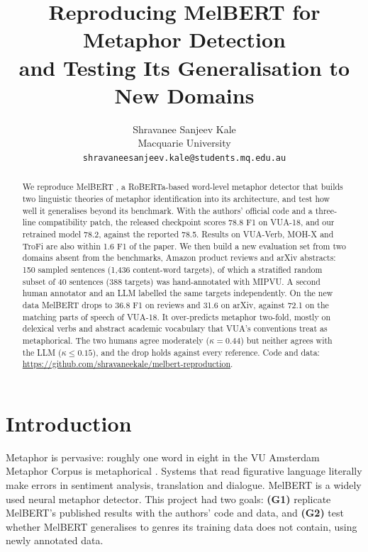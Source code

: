 \documentclass[11pt]{article}
\title{Reproducing MelBERT for Metaphor Detection\\and Testing Its Generalisation to New Domains}
\author{Shravanee Sanjeev Kale \\
  Macquarie University \\
  \texttt{shravaneesanjeev.kale@students.mq.edu.au}}
\newcommand{\repourl}{https://github.com/shravaneekale/melbert-reproduction}
\begin{document}
\maketitle

\begin{abstract}
We reproduce MelBERT \citep{choi-etal-2021-melbert}, a RoBERTa-based word-level metaphor detector that builds two linguistic theories of metaphor identification into its architecture, and test how well it generalises beyond its benchmark. With the authors' official code and a three-line compatibility patch, the released checkpoint scores 78.8 F1 on VUA-18, and our retrained model 78.2, against the reported 78.5. Results on VUA-Verb, MOH-X and TroFi are also within 1.6 F1 of the paper. We then build a new evaluation set from two domains absent from the benchmarks, Amazon product reviews and arXiv abstracts: 150 sampled sentences (1,436 content-word targets), of which a stratified random subset of 40 sentences (388 targets) was hand-annotated with MIPVU. A second human annotator and an LLM labelled the same targets independently. On the new data MelBERT drops to 36.8 F1 on reviews and 31.6 on arXiv, against 72.1 on the matching parts of speech of VUA-18. It over-predicts metaphor two-fold, mostly on delexical verbs and abstract academic vocabulary that VUA's conventions treat as metaphorical. The two humans agree moderately ($\kappa = 0.44$) but neither agrees with the LLM ($\kappa \le 0.15$), and the drop holds against every reference. Code and data: \url{\repourl}.
\end{abstract}

\section{Introduction}

Metaphor is pervasive: roughly one word in eight in the VU Amsterdam Metaphor Corpus is metaphorical \citep{steen2010method}. Systems that read figurative language literally make errors in sentiment analysis, translation and dialogue. MelBERT \citep{choi-etal-2021-melbert} is a widely used neural metaphor detector. This project had two goals:
\textbf{(G1)} replicate MelBERT's published results with the authors' code and data, and
\textbf{(G2)} test whether MelBERT generalises to genres its training data does not contain, using newly annotated data.

\end{document}

